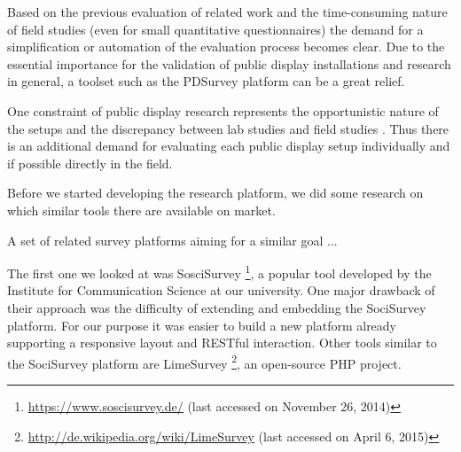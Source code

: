 	Based on the previous evaluation of related work and the time-consuming nature of field studies (even for small quantitative questionnaires) the demand for a simplification or automation of the evaluation process becomes clear. Due to the essential importance for the validation of public display installations and research in general, a toolset such as the PDSurvey platform can be a great relief. 

	One constraint of public display research represents the opportunistic nature of the setups and the discrepancy between lab studies and field studies \cite{Ojala2011}. Thus there is an additional demand for evaluating each public display setup individually and if possible directly in the field.








	Before we started developing the research platform, we did some research on which similar tools there are available on market. 



	A set of related survey platforms aiming for a similar goal ...

	The first one we looked at was SosciSurvey \footnote{\url{https://www.soscisurvey.de/} (last accessed on November 26, 2014)}, a popular tool developed by the Institute for Communication Science at our university. One major drawback of their approach was the difficulty of extending and embedding the SociSurvey platform. For our purpose it was easier to build a new platform already supporting a responsive layout and RESTful interaction. Other tools similar to the SociSurvey platform are LimeSurvey \footnote{\url{http://de.wikipedia.org/wiki/LimeSurvey} (last accessed on April 6, 2015)}, an open-source PHP project.


